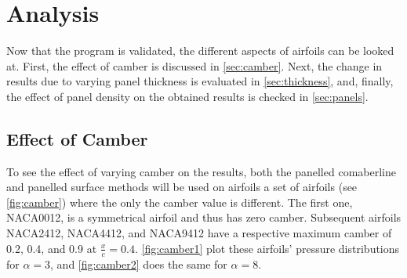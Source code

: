 \chapter{Analysis}
Now that the program is validated, the different aspects of airfoils can be
looked at. First, the effect of camber is discussed in \autoref{sec:camber}.
Next, the change in results due to varying panel thickness is evaluated in
\autoref{sec:thickness}, and, finally, the effect of panel density on the
obtained results is checked in \autoref{sec:panels}.

\section{Effect of Camber}
\label{sec:camber}
To see the effect of varying camber on the results, both the panelled
comaberline and panelled surface methods will be used on airfoils a set of
airfoils (see \autoref{fig:camber}) where the only the camber value is
different. The first one, NACA0012, is a symmetrical airfoil and thus has zero
camber. Subsequent airfoils NACA2412, NACA4412, and NACA9412 have a respective
maximum camber of 0.2, 0.4, and 0.9 at $\frac{x}{c}=0.4$. \autoref{fig:camber1}
plot these airfoils' pressure distributions for $\alpha=3$, and
\autoref{fig:camber2} does the same for $\alpha=8$.

